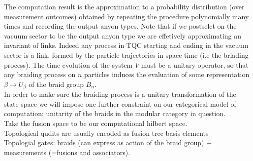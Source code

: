 \documentclass{article}
\begin{document}
The computation result is the approximation to a probability distribution (over measurement outcomes) obtained by repeating the procedure polynomially many times and recording the output anyon types. Note that if we postselct on the vacuum sector to be the output anyon type we are effetively approximating an invariant of links. Indeed any process in TQC starting and ending in the vacuum sector is a link, formed by the particle trajectories in space-time (i.e the briading process). The time evolution of the system $V$ must be a unitary operator, so that any braiding process on $n$ particles induces the evaluation of some representation $\beta \rightarrow U_\beta$ of the braid group $B_n$.\\
In order to make sure the braiding process is a unitary transformation of the state space we will impose one further constraint on our categorical model of computation: unitarity of the braids in the modular category in question.\\
Take the fusion space to be our computational hilbert space.\\
Topological qudits are usually encoded as fusion tree basis elements\\
Topologial gates: braids (can express as action of the braid group) + measurements (=fusions and associators).
\end{document}
